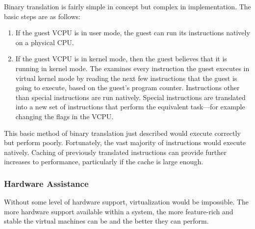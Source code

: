 Binary translation is fairly simple in concept but complex in implementation.
The basic steps are as follows:
\begin{enumerate}[noitemsep]
\item If the guest VCPU is in user mode, the guest can run its instructions natively on a physical CPU.\@
\item If the guest VCPU is in kernel mode, then the guest believes that it is running in kernel mode.
  The  examines every instruction the guest executes in virtual kernel mode by reading the next few instructions that the guest is going to execute, based on the guest's program counter.
  Instructions other than special instructions are run natively.
  Special instructions are translated into a new set of instructions that perform the equivalent task—for example changing the flags in the VCPU.\@
\end{enumerate}

This basic method of binary translation just described would execute correctly but perform poorly.
Fortunately, the vast majority of instructions would execute natively.
Caching of previously translated instructions can provide further increases to performance, particularly if the cache is large enough.

\subsubsection{Hardware Assistance}\label{subsubsec:VM_Hardware_Assistance}
Without some level of hardware support, virtualization would be impossible.
The more hardware support available within a system, the more feature-rich and stable the virtual machines can be and the better they can perform.



